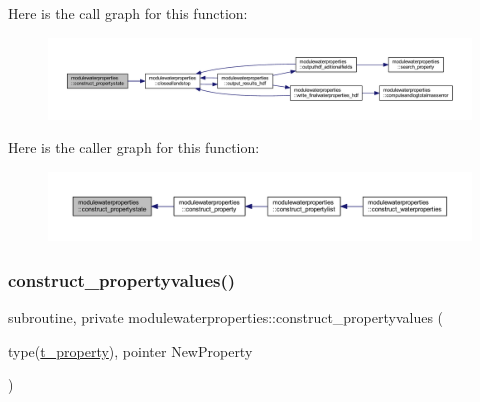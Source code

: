 Here is the call graph for this function\+:\nopagebreak
\begin{figure}[H]
\begin{center}
\leavevmode
\includegraphics[width=350pt]{namespacemodulewaterproperties_ae8c62a5189e434530eafcfe1fe66dae4_cgraph}
\end{center}
\end{figure}
Here is the caller graph for this function\+:\nopagebreak
\begin{figure}[H]
\begin{center}
\leavevmode
\includegraphics[width=350pt]{namespacemodulewaterproperties_ae8c62a5189e434530eafcfe1fe66dae4_icgraph}
\end{center}
\end{figure}
\mbox{\label{namespacemodulewaterproperties_aa646aa8763204437f6ad88ddbd01c560}} 
\subsubsection{\texorpdfstring{construct\+\_\+propertyvalues()}{construct\_propertyvalues()}}
{\footnotesize\ttfamily subroutine, private modulewaterproperties\+::construct\+\_\+propertyvalues (\begin{DoxyParamCaption}\item[{type(\mbox{\hyperlink{structmodulewaterproperties_1_1t__property}{t\+\_\+property}}), pointer}]{New\+Property }\end{DoxyParamCaption})\hspace{0.3cm}{\ttfamily [private]}}

